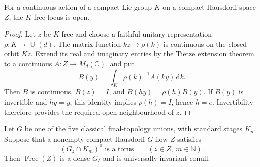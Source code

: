 \begin{lemma}\label{lem:ind-compact-free-open}
For a continuous action of a compact Lie group $K$ on a compact
Hausdorff space $Z$, the $K$-free locus is open.
\end{lemma}

\begin{proof}
Let $z$ be $K$-free and choose a faithful unitary representation
$\rho:K\to\operatorname{U}(d)$. The matrix function $kz\mapsto\rho(k)$ is
continuous on the closed orbit $Kz$. Extend its real and imaginary
entries by the Tietze extension theorem to a continuous
$A:Z\to M_d(\mathbb C)$, and put
\[
B(y)=\int_K\rho(k)^{-1}A(ky)\,\mathrm d k.
\]
Then $B$ is continuous, $B(z)=I$, and
$B(hy)=\rho(h)B(y)$. If $B(y)$ is invertible and $hy=y$, this
identity implies $\rho(h)=I$, hence $h=e$. Invertibility therefore
provides the required open neighbourhood of $z$.
\end{proof}

\begin{proposition}\label{prop:ind-generic-free-locus}
Let $G$ be one of the five classical final-topology unions, with
standard stages $K_n$. Suppose that a nonempty compact Hausdorff
$G$-flow $Z$ satisfies
\[
(G_z\cap K_m)^0\text{ is a torus}\qquad(z\in Z,\ m\in\mathbb N).
\]
Then $\operatorname{Free}(Z)$ is a dense $G_\delta$ and is
universally invariant-conull.
\end{proposition}

